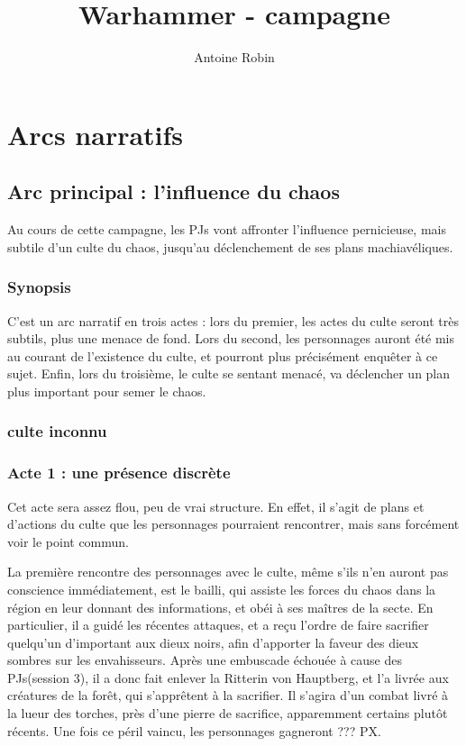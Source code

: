 \documentclass[10pt,a4paper]{book}
\author{ Antoine Robin}
\title{Warhammer - campagne}
\newcommand{\nomadversaire}{culte inconnu}
\begin{document}
\maketitle
\tableofcontents
\chapter{Arcs narratifs}
\section{Arc principal : l'influence du chaos}
Au cours de cette campagne, les PJs vont affronter l'influence pernicieuse, mais subtile d'un culte du chaos, jusqu'au déclenchement de ses plans machiavéliques.
\subsection{Synopsis}
 C'est un arc narratif en trois actes : lors du premier, les actes du culte seront très subtils, plus une menace de fond. Lors du second, les personnages auront été mis au courant de l'existence du culte, et pourront plus précisément enquêter à ce sujet. Enfin, lors du troisième, le culte se sentant menacé, va déclencher un plan plus important pour semer le chaos.
\subsection{\nomadversaire}
 
\subsection{Acte 1 : une présence discrète}
Cet acte sera assez flou, peu de vrai structure. En effet, il s'agit de plans et d'actions du culte que les personnages pourraient rencontrer, mais sans forcément voir le point commun.

La première rencontre des personnages avec le culte, même s'ils n'en auront pas conscience immédiatement, est le bailli, qui assiste les forces du chaos dans la région en leur donnant des informations, et obéi à ses maîtres de la secte. En particulier, il a guidé les récentes attaques, et a reçu l'ordre de faire sacrifier quelqu'un d'important aux dieux noirs, afin d'apporter la faveur des dieux sombres sur les envahisseurs. Après une embuscade échouée à cause des PJs(session 3), il a donc fait enlever la Ritterin von Hauptberg, et l'a livrée aux créatures de la forêt, qui s'apprêtent à la sacrifier. Il s'agira d'un combat livré à la lueur des torches, près d'une pierre de sacrifice, apparemment certains plutôt récents. Une fois ce péril vaincu, les personnages gagneront ??? PX.
\end{document}
